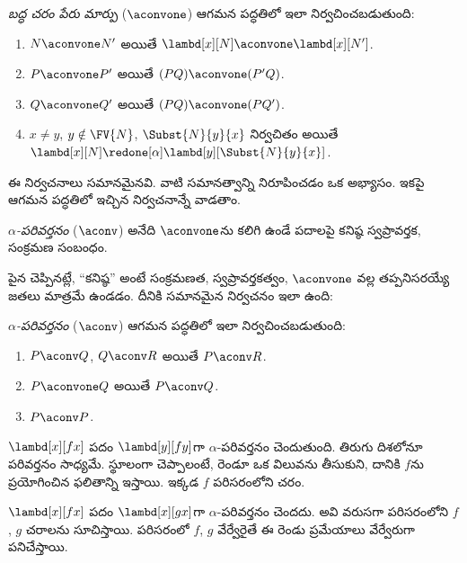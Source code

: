 \documentclass[../../../include/open-logic-section]{subfiles}
\begin{document}
\begin{defn}[బద్ధ చరం పేరు మార్పు, $\aconvone$] 
  \emph{బద్ధ చరం పేరు మార్పు} ($\aconvone$) ఆగమన పద్ధతిలో ఇలా
  నిర్వచించబడుతుంది:
  \begin{enumerate}
  \item $N \aconvone N'$ అయితే $\lambd[x][N] \aconvone
    \lambd[x][N']$. 
  \item $P \aconvone P'$ అయితే $(PQ) \aconvone (P'Q)$.
  \item $Q \aconvone Q'$ అయితే $(PQ) \aconvone (PQ')$.
  \item $x \neq y$, $y \notin \FV{N}$, $\Subst{N}{y}{x}$ నిర్వచితం
    అయితే $\lambd[x][N] \redone[\alpha]
    \lambd[y][\Subst{N}{y}{x}]$.
  \end{enumerate}
\end{defn}

ఈ నిర్వచనాలు సమానమైనవి. వాటి సమానత్వాన్ని నిరూపించడం ఒక అభ్యాసం.
ఇకపై ఆగమన పద్ధతిలో ఇచ్చిన నిర్వచనాన్నే వాడతాం.

\begin{defn}
  \emph{$\alpha$-పరివర్తనం} ($\aconv$) అనేది $\aconvone$ను
  కలిగి ఉండే పదాలపై కనిష్ఠ స్వప్రావర్తక, సంక్రమణ సంబంధం.
\end{defn}

పైన చెప్పినట్లే, “కనిష్ఠ” అంటే సంక్రమణత, స్వప్రావర్తకత్వం,
$\aconvone$ వల్ల తప్పనిసరయ్యే జతలు మాత్రమే ఉండడం. దీనికి సమానమైన
నిర్వచనం ఇలా ఉంది:

\begin{defn} 
  \emph{$\alpha$-పరివర్తనం} ($\aconv$) ఆగమన పద్ధతిలో ఇలా
  నిర్వచించబడుతుంది:
  \begin{enumerate}
  \item $P \aconv Q$, $Q \aconv R$ అయితే $P \aconv R$.
  \item $P \aconvone Q$ అయితే $P \aconv Q$.
  \item $P \aconv P$. 
  \end{enumerate}
\end{defn}

\begin{ex}
  $\lambd[x][f x]$ పదం $\lambd[y][f y]$గా $\alpha$-పరివర్తనం
చెందుతుంది. తిరుగు దిశలోనూ పరివర్తనం సాధ్యమే. స్థూలంగా చెప్పాలంటే,
రెండూ ఒక విలువను తీసుకుని, దానికి $f$ను ప్రయోగించిన ఫలితాన్ని ఇస్తాయి.
  ఇక్కడ $f$ పరిసరంలోని చరం.

  $\lambd[x][f x]$ పదం $\lambd[x][g x]$గా $\alpha$-పరివర్తనం
  చెందదు. అవి వరుసగా పరిసరంలోని $f$, $g$ చరాలను సూచిస్తాయి.
  పరిసరంలో $f$, $g$ వేర్వేరైతే ఈ రెండు ప్రమేయాలు వేర్వేరుగా పనిచేస్తాయి.
\end{ex}
\end{document}
